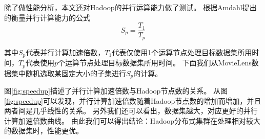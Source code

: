 除了做性能分析，本文还对Hadoop的并行运算能力做了测试。
根据Amdahl\parencite{Amdahl1967Validity}提出的衡量并行计算能力的公式
\begin{equation}
S_p = \frac{T_1}{T_p}
\end{equation}

其中$S_p$代表并行计算加速倍数，$T_1$代表仅使用1个运算节点处理目标数据集所用时间，$T_p$代表使用$p$个运算节点处理目标数据集所用时间。
下面我们从MovieLens数据集中随机选取某固定大小的子集进行$S_p$的计算。
\begin{center}
\pgfplotsset{compat=1.13}
\label{fig:speedup}
\end{center}

图\ref{fig:speedup}描述了并行计算加速倍数与Hadoop节点数的关系。
从图\ref{fig:speedup}可以发现，并行计算加速倍数随着Hadoop节点数的增加而增加，并且两者间是几乎线性的关系。
另外我们还可以看出，数据集越大，对应更好的并行计算加速倍数曲线。
由此我们可以得出结论：Hadoop分布式集群在处理相对较大的数据集时，性能更优。